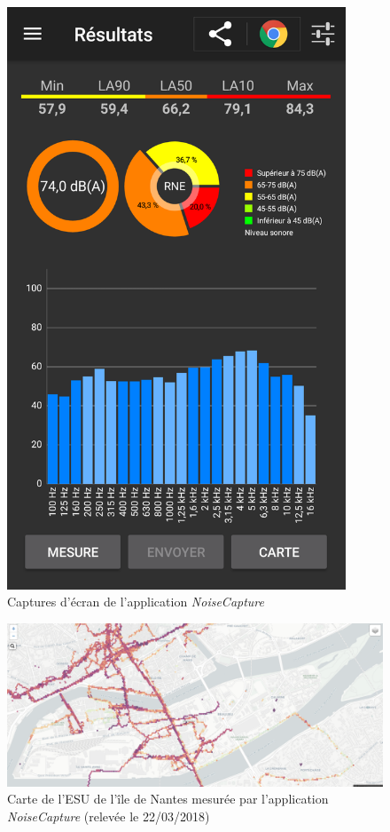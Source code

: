 \begin{figure}[t]
\begin{center}
\begin{minipage}[t]{0.3\textwidth}
        \includegraphics[width=0.9\textwidth]{./figures/autres/noiseCapture2.png}
    \end{minipage}
    \caption{Captures d'écran de l'application \textit{NoiseCapture}}
\end{center}
\end{figure}


\begin{figure}[t]
\centering
\includegraphics[width=0.7\linewidth]{./figures/cartographie/noise_modelling.PNG}
\caption{Carte de l'ESU de l'île de Nantes mesurée par l'application \textit{NoiseCapture}  (relevée le 22/03/2018)}
\label{fig:carte_noiseModelling}
\end{figure}


